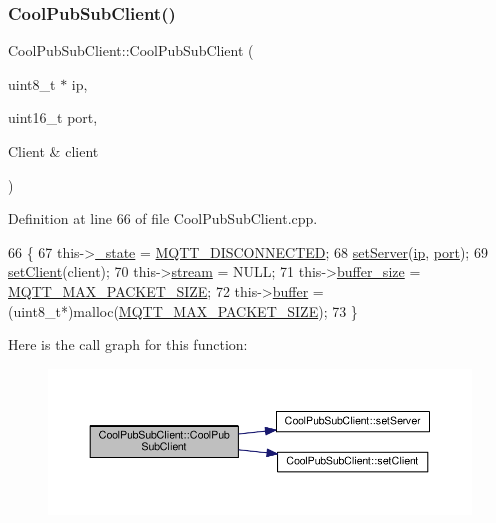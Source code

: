 \subsubsection{\texorpdfstring{Cool\+Pub\+Sub\+Client()}{CoolPubSubClient()}\hspace{0.1cm}{\footnotesize\ttfamily [7/14]}}
{\footnotesize\ttfamily Cool\+Pub\+Sub\+Client\+::\+Cool\+Pub\+Sub\+Client (\begin{DoxyParamCaption}\item[{uint8\+\_\+t $\ast$}]{ip,  }\item[{uint16\+\_\+t}]{port,  }\item[{Client \&}]{client }\end{DoxyParamCaption})}



Definition at line 66 of file Cool\+Pub\+Sub\+Client.\+cpp.


\begin{DoxyCode}
66                                                                              \{
67     this->\hyperlink{class_cool_pub_sub_client_aa1953b601206252a30efa5b114eb3e1a}{\_state} = \hyperlink{_cool_pub_sub_client_8h_adaf86a906a305dd129164982d50111b3}{MQTT\_DISCONNECTED};
68     \hyperlink{class_cool_pub_sub_client_a947e70c394c66c7d08d0c53caf8425e3}{setServer}(\hyperlink{class_cool_pub_sub_client_adabd958c6c3462433a3f3393f40a0966}{ip}, \hyperlink{class_cool_pub_sub_client_a01e3249102c057756af7a515c179844e}{port});
69     \hyperlink{class_cool_pub_sub_client_a7ee119b786010561ab6a9afa0798e91d}{setClient}(client);
70     this->\hyperlink{class_cool_pub_sub_client_a7a92417b317e7bd9502ed37752111705}{stream} = NULL;
71     this->\hyperlink{class_cool_pub_sub_client_ae6cb10e42c057483d53516ac830ab526}{buffer\_size} = \hyperlink{_cool_pub_sub_client_8h_ae09b594688a59f1427c7e45259e039b9}{MQTT\_MAX\_PACKET\_SIZE};
72     this->\hyperlink{class_cool_pub_sub_client_a7e8bcc6096626916046a51bebadc7851}{buffer} = (uint8\_t*)malloc(\hyperlink{_cool_pub_sub_client_8h_ae09b594688a59f1427c7e45259e039b9}{MQTT\_MAX\_PACKET\_SIZE});
73 \}
\end{DoxyCode}
Here is the call graph for this function\+:\nopagebreak
\begin{figure}[H]
\begin{center}
\leavevmode
\includegraphics[width=350pt]{d8/d4b/class_cool_pub_sub_client_a15e4dd41ebda943c377539086f70469d_cgraph}
\end{center}
\end{figure}
\mbox{\label{class_cool_pub_sub_client_a3e7d7fa4b55e36f0ac8912335993d650}} 
